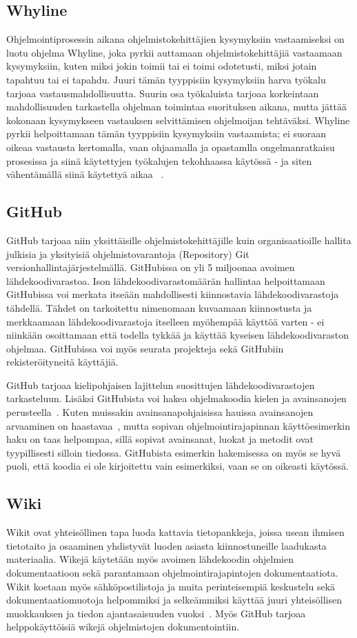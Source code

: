 \documentclass[finnish]{../tktltiki2}
\theoremstyle{definition}
\theoremstyle{remark}
\begin{document}
\subsection{Whyline}
Ohjelmointiprosessin aikana ohjelmistokehittäjien kysymyksiin vastaamiseksi on luotu ohjelma Whyline, joka pyrkii auttamaan ohjelmistokehittäjiä vastaamaan kysymyksiin, kuten miksi jokin toimii tai ei toimi odotetusti, miksi jotain tapahtuu tai ei tapahdu. Juuri tämän tyyppisiin kysymyksiin harva työkalu tarjoaa vastausmahdollisuutta. Suurin osa työkaluista tarjoaa korkeintaan mahdollisuuden tarkastella ohjelman toimintaa suorituksen aikana, mutta jättää kokonaan kysymykseen vastauksen selvittämisen ohjelmoijan tehtäväksi.
Whyline pyrkii helpoittamaan tämän tyyppisiin kysymyksiin vastaamista; ei suoraan oikeaa vastausta kertomalla, vaan ohjaamalla ja opastamlla ongelmanratkaisu prosesissa ja siinä käytettyjen työkalujen tekohhaassa käytössä - ja siten vähentämällä siinä käytettyä aikaa ~\cite{whyline}.
\subsection{GitHub}
GitHub tarjoaa niin yksittäisille ohjelmistokehittäjille kuin organisaatioille hallita julkisia ja yksityisiä ohjelmistovarantoja (Repository) Git versionhallintajärjestelmällä. GitHubissa on yli 5 miljoonaa avoimen lähdekoodivarastoa. Ison lähdekoodivarastomäärän hallintaa helpoittamaan GitHubissa voi merkata itseään mahdollisesti kiinnostavia lähdekoodivarastoja tähdellä. Tähdet on tarkoitettu nimenomaan kuvaamaan kiinnostusta ja merkkaamaan lähdekoodivarastoja itselleen myöhempää käyttöä varten - ei niinkään osoittamaan että todella tykkää ja käyttää kyseisen lähdekoodivaraston ohjelmaa\cite{social-networking-meets-se}.
GitHubissa voi myös seurata projekteja sekä GitHubiin rekisteröityneitä käyttäjiä.

GitHub tarjoaa kielipohjaisen lajittelun suosittujen lähdekoodivarastojen tarkasteluun. Lisäksi GitHubista voi hakea ohjelmakoodia kielen ja avainsanojen perusteella~\cite{social-networking-meets-se}. Kuten muissakin avainsanapohjaisissa hauissa avainsanojen arvaaminen on haastavaa~\cite{what-to-search-for}, mutta sopivan ohjelmointirajapinnan käyttöesimerkin haku on taas helpompaa, sillä sopivat avainsanat, luokat ja metodit ovat tyypillisesti silloin tiedossa. GitHubista esimerkin hakemisessa on myös se hyvä puoli, että koodia ei ole kirjoitettu vain esimerkiksi, vaan se on oikeasti käytössä.
\subsection{Wiki}
Wikit ovat yhteisöllinen tapa luoda kattavia tietopankkeja, joissa usean ihmisen tietotaito ja osaaminen yhdistyvät luoden asiasta kiinnostuneille laadukasta materiaalia. Wikejä käytetään myös avoimen lähdekoodin ohjelmien dokumentaatioon sekä parantamaan ohjelmointirajapintojen dokumentaatiota. Wikit koetaan myös sähköpostilistoja ja muita perinteisempiä keskustelu sekä dokumentaatiomuotoja helpommiksi ja selkeämmiksi käyttää juuri yhteisöllisen muokkauksen ja tiedon ajantasaisuuden vuoksi~\cite{using-wikis-in-sw}.
Myös GitHub tarjoaa helppokäyttöisiä wikejä ohjelmistojen dokumentointiin. \cite{github-wiki}
\end{document}

